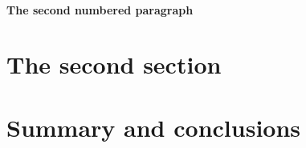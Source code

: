\paragraph{The second numbered paragraph}

\section{The second section}

\section{Summary and conclusions}


